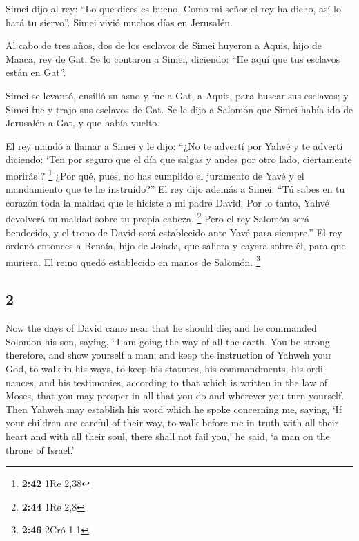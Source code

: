 \begin{paracol}{2}
 Simei dijo al rey: ``Lo que dices es bueno. Como mi
señor el rey ha dicho, así lo hará tu siervo''. Simei vivió muchos días
en Jerusalén.

 Al cabo de tres años, dos de los esclavos de Simei
huyeron a Aquis, hijo de Maaca, rey de Gat. Se lo contaron a Simei,
diciendo: ``He aquí que tus esclavos están en Gat''.

 Simei se levantó, ensilló su asno y fue a Gat, a Aquis,
para buscar sus esclavos; y Simei fue y trajo sus esclavos de Gat.
 Se le dijo a Salomón que Simei había ido de Jerusalén a
Gat, y que había vuelto.

 El rey mandó a llamar a Simei y le dijo: ``¿No te
advertí por Yahvé y te advertí diciendo: `Ten por seguro que el día que
salgas y andes por otro lado, ciertamente morirás'? \footnote{\textbf{2:42}
  1Re 2,38}  ¿Por qué, pues, no has cumplido el juramento
de Yavé y el mandamiento que te he instruido?''  El rey
dijo además a Simei: ``Tú sabes en tu corazón toda la maldad que le
hiciste a mi padre David. Por lo tanto, Yahvé devolverá tu maldad sobre
tu propia cabeza. \footnote{\textbf{2:44} 1Re 2,8}  Pero
el rey Salomón será bendecido, y el trono de David será establecido ante
Yavé para siempre.''  El rey ordenó entonces a Benaía,
hijo de Joiada, que saliera y cayera sobre él, para que muriera. El
reino quedó establecido en manos de Salomón. \footnote{\textbf{2:46}
  2Cró 1,1}

\switchcolumn
\begin{otherlanguage}{english}

\hypertarget{section-3}{%
\section{2}\label{section-3}}

 Now the days of David came near that he should die; and
he commanded Solomon his son, saying,  ``I am going the
way of all the earth. You be strong therefore, and show yourself a man;
 and keep the instruction of Yahweh your God, to walk in
his ways, to keep his statutes, his commandments, his ordinances, and
his testimonies, according to that which is written in the law of Moses,
that you may prosper in all that you do and wherever you turn yourself.
 Then Yahweh may establish his word which he spoke
concerning me, saying, `If your children are careful of their way, to
walk before me in truth with all their heart and with all their soul,
there shall not fail you,' he said, `a man on the throne of Israel.'


\end{otherlanguage}
\end{paracol}
